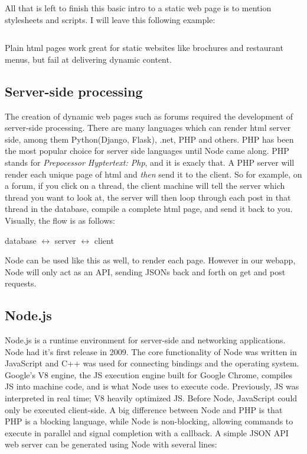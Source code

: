 All that is left to finish this basic intro to a static web page is to mention
stylesheets and scripts. I will leave this following example:

\inputminted{html}{files/html/DNA.html}

Plain html pages work great for static websites like brochures and restaurant
menus, but fail at delivering dynamic content. 

\subsection{Server-side processing}

The creation of dynamic web pages such as forums required the development of
server-side processing. There are many languages which can render html server
side, among them Python(Django, Flask), .net, PHP and others. PHP has been the
most popular choice for server side languages until Node came along. PHP stands
for \textit{Prepocessor Hyptertext: Php}, and it is exacly that. A PHP server
will render each unique page of html and \textit{then} send it to the client. So
for example, on a forum, if you click on a thread, the client machine will tell
the server which thread you want to look at, the server will then loop through
each post in that thread in the database, compile a complete html page, and send
it back to you. Visually, the flow is as follows:

\begin{center}
database $\leftrightarrow$ server $\leftrightarrow$ client
\end{center}

Node can be used like this as well, to render each page. However in our webapp,
Node will only act as an API, sending JSONs back and forth on get and post 
requests. 

\subsection{Node.js}

Node.js is a runtime environment for server-side and networking applications.
Node had it's first release in 2009. The core functionality of Node was written
in JavaScript and C++ was used for connecting bindings and the operating system.
Google's V8 engine, the JS execution engine built for Google Chrome, compiles JS
into machine code, and is what Node uses to execute code. Previously, JS was
interpreted in real time; V8 heavily optimized JS.  Before Node, JavaScript
could only be executed client-side. A big difference between Node and PHP is
that PHP is a blocking language, while Node is non-blocking, allowing commands
to execute in parallel and signal completion with a callback.  A simple JSON API
web server can be generated using Node with several lines:

